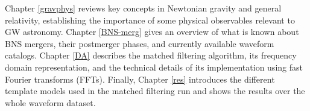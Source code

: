 Chapter \ref{gravphys} reviews key concepts in Newtonian gravity and general relativity, establishing the importance of some physical observables relevant to GW astronomy. Chapter \ref{BNS-merg} gives an overview of what is known about BNS mergers, their postmerger phases, and currently available waveform catalogs. Chapter \ref{DA} describes the matched filtering algorithm, its frequency domain representation, and the technical details of its implementation using fast Fourier transforms (FFTs). Finally, Chapter \ref{res} introduces the different template models used in the matched filtering run and shows the results over the whole waveform dataset.


